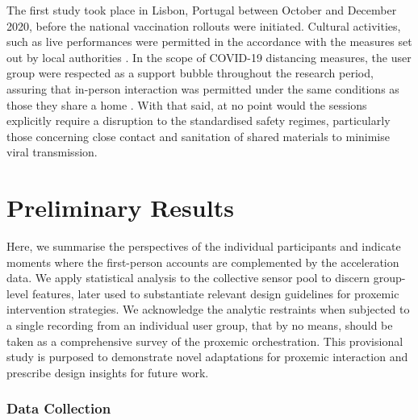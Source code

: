 The first study took place in Lisbon, Portugal between October and December 2020, before the national vaccination rollouts were initiated. Cultural activities, such as live performances were permitted in the accordance with the measures set out by local authorities \cite{direcao-geral_da_saude_dgs_covid-19_2020}. In the scope of COVID-19 distancing measures, the user group were respected as a support bubble throughout the research period, assuring that in-person interaction was permitted under the same conditions as those they share a home \citep{trotter_ways_2021}. With that said, at no point would the sessions explicitly require a disruption to the standardised safety regimes, particularly those concerning close contact and sanitation of shared materials to minimise viral transmission.


\section{Preliminary Results}
\label{sec:results}

Here, we summarise the perspectives of the individual participants and indicate moments where the first-person accounts are complemented by the acceleration data. We apply statistical analysis to the collective sensor pool to discern group-level features, later used to substantiate relevant design guidelines for proxemic intervention strategies. We acknowledge the analytic restraints when subjected to a single recording from an individual user group, that by no means, should be taken as a comprehensive survey of the proxemic orchestration. This provisional study is purposed to demonstrate novel adaptations for proxemic interaction and prescribe design insights for future work.


\subsubsection{Data Collection}
\label{sec:data_collection}


